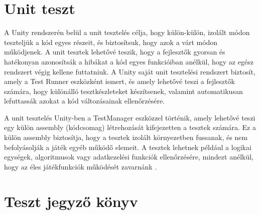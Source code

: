 \documentclass[
]{thesis-ekf}
\theoremstyle{definition}
\theoremstyle{remark}
\begin{document}
\section{Unit teszt}
A Unity rendszerén belül a unit tesztelés célja, hogy külön-külön, izolált módon teszteljük a kód egyes részeit, és biztosítsuk, hogy azok a várt módon működjenek. A unit tesztek lehetővé teszik, hogy a fejlesztők gyorsan és hatékonyan azonosítsák a hibákat a kód egyes funkcióiban anélkül, hogy az egész rendszert végig kellene futtatniuk. A Unity saját unit tesztelési rendszert biztosít, amely a Test Runner eszközként ismert, és amely lehetővé teszi a fejlesztők számára, hogy különálló tesztkészleteket készítsenek, valamint automatikusan lefuttassák azokat a kód változásainak ellenőrzésére.

A unit tesztelés Unity-ben a TestManager eszközzel történik, amely lehetővé teszi egy külön assembly (kódcsomag) létrehozását kifejezetten a tesztek számára. Ez a külön assembly biztosítja, hogy a tesztek izolált környezetben fussanak, és nem befolyásolják a játék egyéb működő elemeit. A tesztek lehetnek például a logikai egységek, algoritmusok vagy adatkezelési funkciók ellenőrzésére, mindezt anélkül, hogy az éles játékfunkciók működését zavarnánk \cite{UnityTestRunner}.

\section{Teszt jegyző könyv}
\end{document}
